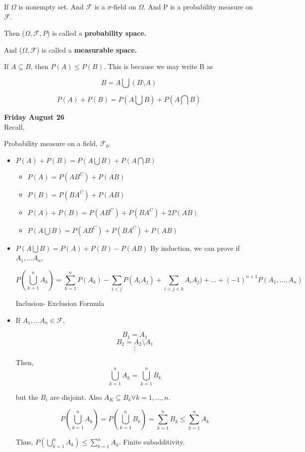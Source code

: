 \documentclass[11pt,fleqn]{book} %
\begin{document}
If $\Omega$ is nonempty set. 
And $\mathcal{F}$ is a $\sigma$-field on $\Omega$.
And P is a probability measure on $\mathcal{F}$.

Then ($\Omega, \mathcal{F}, P$) is called a \textbf{probability space.}

And ($\Omega, \mathcal{F}$) is called a \textbf{measurable space.}


\begin{remark}
	If $A \subseteq B$, then $P(A) \leq P(B)$. This is because we may write B as

	$$B = A \bigcup (B\setminus A) $$
\end{remark}

\begin{remark}
	$$P(A) + P(B) = P(A\bigcup B) + P(A \bigcap  B)$$


\end{remark}

\textbf{Friday August 26}
\\

Recall, 

Probability measure on a field, $\mathcal{F}_0$.

\begin{itemize}
	\item $P(A) + P(B) = P(A\bigcup B) + P(A \bigcap  B)$

	\begin{itemize}
		\item $P(A) = P(AB^C) + P(A B)$
		\item $P(B) = P(B A^C) + P(AB)$
		\item $P(A) + P(B) = P(AB^C) + P(BA^C) + 2P(AB)$
		\item $P(A \bigcup B) = P(AB^C) + P(BA^C) + P(AB)$ 
	\end{itemize}
	
	\item $P(A \bigcup B) = P(A) + P(B) - P(AB)$
		By induction, we can prove if $A_1, \dots A_n$,

		$$P(\displaystyle \bigcup^n_{k=1} A_k) = \displaystyle \sum^n_{k=1} P(A_k) - \displaystyle \sum_{i<j} P(A_iA_j) +
		\displaystyle \sum_{i<j<k} A_iA_j) + \dots + (-1)^{n+1} P(A_1, \dots, A_n)  $$

		Inclusion- Exclusion Formula

	\item If $A_1, \dots A_n \in \mathcal{F}$,

		$$B_1 = A_1 $$
		$$B_2 = A_2 \setminus A_1$$
		$$\vdots $$

		Then, 
		$$\displaystyle \bigcup^n_{k=1} A_k = \displaystyle \bigcup^n_{k=1} B_k $$

		but the $B_i$ are disjoint. Also $A_K \subseteq B_k \forall k=1, \dots, n$.

		$$ P(\displaystyle \bigcup^n_{k=1} A_k) = P(\displaystyle \bigcup^n_{k=1} B_k) = \displaystyle \sum^n_{k=1} B_k \leq \displaystyle \sum^n_{k=1} A_k$$

		Thus, $P(\displaystyle \bigcup^n_{k=1} A_k) \leq \displaystyle \sum^n_{k=1} A_k$. Finite subadditivity. 

\end{itemize}
\end{document}
